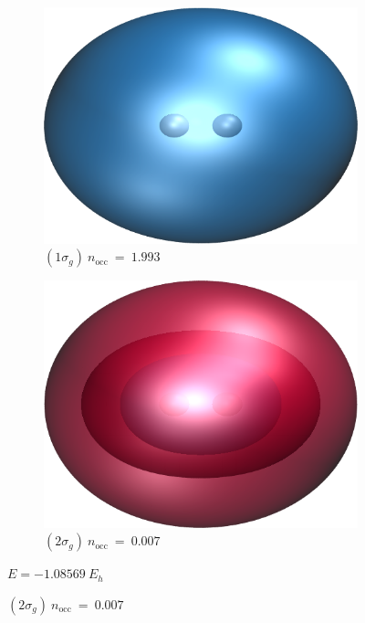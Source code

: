 \documentclass[aip,jcp,reprint,noshowkeys,superscriptaddress]{revtex4-1}
\begin{document}
\begin{figure}
  \begin{subfigure}[l]{0.45\linewidth}
    \includegraphics[width=0.75\linewidth]{Figures/h2_HF_mo1.cube.png}
    \caption*{\centering $(1\sigma_g)~n_\text{occ}~=~1.993$}
  \end{subfigure}
  \begin{subfigure}[r]{0.45\linewidth}
    \includegraphics[width=0.75\linewidth]{Figures/h2_HF_mo3.cube.png}
    \caption*{\centering $(2\sigma_g)~n_\text{occ}~=~0.007$}
  \end{subfigure}
  $E=-1.08569~E_h$
  

\end{figure}
\end{document}
